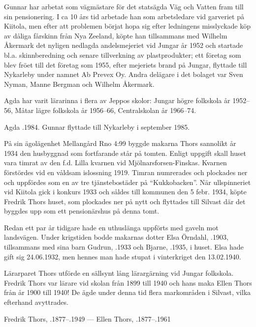 Gunnar har arbetat som vägmästare för det statsägda Väg och Vatten fram till sin pensionering. I ca 10 års tid arbetade han som arbetsledare vid garveriet på Kiitola, men efter att problemen börjat hopa sig efter ledningens misslyckade köp av dåliga fårskinn från Nya Zeeland, köpte han tillsammans med Wilhelm Åkermark det nyligen nedlagda andelsmejeriet vid Jungar år 1952 och startade bl.a. skinnberedning och senare tillverkning av plastprodukter; ett företag som blev fröet till det företag som 1955, efter mejeriets brand på Jungar, flyttade till Nykarleby	under namnet  Ab Prevex Oy. Andra delägare i det bolaget var Sven	Nyman, Manne Bergman och Wilhelm Åkermark.

Agda har varit lärarinna i flera av Jeppos skolor: Jungar högre folkskola år 1952--56, Måtar lägre folkskola år 1956--66, Centralskolan år 1966--74.

Agda .1984. Gunnar flyttade till Nykarleby i september 1985.


På sin ägolägenhet Mellangård Rno 4:99 byggde makarna Thors sannolikt år 1934 den husbyggnad som fortfarande står på tomten. Enligt uppgift skall huset vara timrat av den f.d. Lilla kvarnen vid	Mjölnarsforsen-Finskas. Kvarnen förstördes vid en våldsam islossning 1919. Timran numrerades och plockades ner och uppfördes som	en av tre tjänstebostäder på ``Kukkobacken''. När ullspinneriet vid	Kiitola gick i konkurs 1933 och såldes till kommunen den 5 febr. 1934, köpte Fredrik Thors huset, som plockades ner på nytt och flyttades till Silvast där det byggdes upp som ett pensionärshus på denna tomt.

Redan ett par år tidigare hade en uthuslänga uppförts med gaveln	mot landsvägen. Under krigstiden bodde makarnas dotter Elsa Örndahl, .1903, tillsammans med sina barn Gudrun, .1933 och Bjarne, .1935, i huset. Elsa hade gift sig 24.06.1932, men hennes man hade stupat i vinterkriget den 13.02.1940.

Lärarparet Thors utförde en sällsynt lång lärargärning vid Jungar	folkskola. Fredrik Thors var lärare vid skolan från 1899 till 1940 och hans maka Ellen Thors från år 1900 till 1940! De ägde under denna tid flera markområden i Silvast, vilka efterhand avyttrades.

Fredrik Thors, .1877--.1949  ---  Ellen Thors, .1877--.1961



